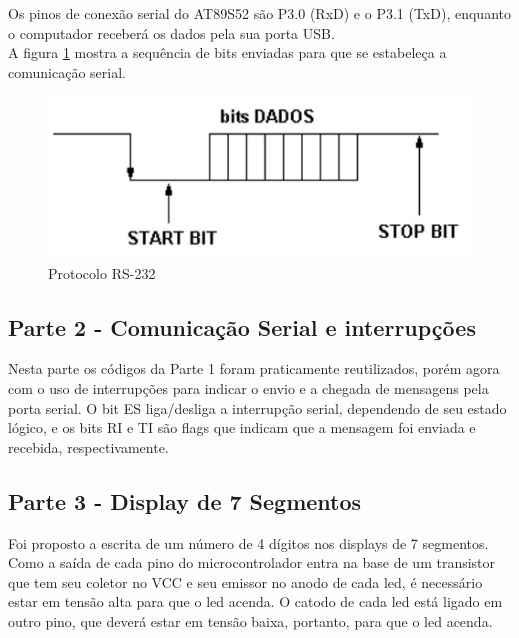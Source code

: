 \documentclass[
    a4paper,
    brazil
    ]{article}
\begin{document}
        Os pinos de conexão serial do AT89S52 são P3.0 (RxD) e o P3.1 (TxD), enquanto o computador receberá os dados pela sua porta USB.\\
        
        
        A figura \ref{rs232} mostra a sequência de bits enviadas para que se estabeleça a comunicação serial.\\
        
        \begin{figure}[H]
            \centering
            \includegraphics[scale=1]
            {imagens/rs232.jpg}
            \caption{Protocolo RS-232}
            \label{rs232}
        \end{figure}
    
        
    
    \subsection{Parte 2 - Comunicação Serial e interrupções}
        Nesta parte os códigos da Parte 1 foram praticamente reutilizados, porém agora com o uso de interrupções para indicar o envio e a chegada de mensagens pela porta serial. O bit ES liga/desliga a interrupção serial, dependendo de seu estado lógico, e os bits RI e TI são flags que indicam que a mensagem foi enviada e recebida, respectivamente.\\
        

            
    \subsection{Parte 3 - Display de 7 Segmentos}
        Foi proposto a escrita de um número de 4 dígitos nos displays  de 7 segmentos. Como a saída de cada pino do microcontrolador entra na base de um transistor que tem seu coletor no VCC e seu emissor no anodo de cada led, é necessário estar em tensão alta para que o led acenda. O catodo de cada led está ligado em outro pino, que deverá estar em tensão baixa, portanto, para que o led acenda.\\
        
\end{document}
